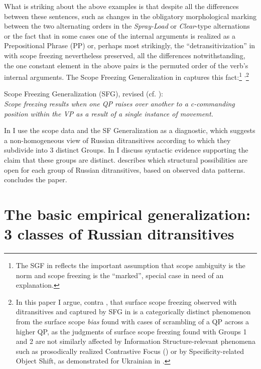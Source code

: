 \documentclass[output=paper,colorlinks,citecolor=brown,modfonts,nonflat]{langsci/langscibook}
\begin{document}
What is striking about the above examples is that despite all the differences between these sentences, such as changes in the obligatory morphological marking between the two alternating orders in the \textit{Spray-Load} or \textit{Clear}{}-type alternations or the fact that in some cases one of the internal arguments is realized as a Prepositional Phrase (PP) or, perhaps most strikingly, the “detransitivization” in  with scope freezing nevertheless preserved, all the differences notwithstanding, the one constant element in the above pairs is the permuted order of the verb’s internal arguments. The Scope Freezing Generalization in  captures this fact:\footnote{The SGF in  reflects the important assumption that scope ambiguity is the norm and scope freezing is the “marked”, special case in need of an explanation.} \textsuperscript{,}\footnote{In this paper I argue, contra \citet{Antonyuk2015}, that surface scope freezing observed with ditransitives and captured by SFG in  is a categorically distinct phenomenon from the surface scope \textit{bias} found with cases of scrambling of a QP across a higher QP, as the judgments of surface scope freezing found with Groups 1 and 2 are not similarly affected by Information Structure-relevant phenomena such as prosodically realized Contrastive Focus (\citealt{AntonyukLarson2016}) or by Specificity-related Object Shift, as demonstrated for Ukrainian in \citet{AntonyukMykhaylykUR}.}

\ea%
    \label{ex:antonyuk:8}
    Scope Freezing Generalization (SFG), revised (cf. \citealt{Antonyuk2015}):\\
    \textit{Scope freezing results when one QP raises over another to a c-commanding position within the VP as a result of a single instance of movement.}
    \z

In  I use the scope data and the SF Generalization as a diagnostic, which suggests a non-homogeneous view of Russian ditransitives according to which they subdivide into 3 distinct Groups. In  I discuss syntactic evidence supporting the claim that these groups are distinct.  describes which structural possibilities are open for each group of Russian ditransitives, based on observed data patterns.  concludes the paper.

\section{The basic empirical generalization: 3 classes of Russian ditransitives}\label{sec:antonyuk:2}
\end{document}
